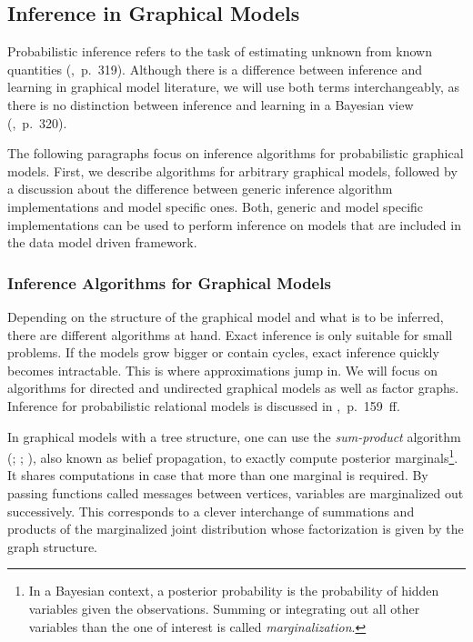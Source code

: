 \subsection{Inference in Graphical Models}
\label{subsec:inference}

Probabilistic inference refers to the task of estimating unknown from known quantities (\cite{murphy2012machine},~p.~319). Although there is a difference between inference and learning in graphical model literature, we will use both terms interchangeably, as there is no distinction between inference and learning in a Bayesian view (\cite{murphy2012machine},~p.~320).

The following paragraphs focus on inference algorithms for probabilistic graphical models. First, we describe algorithms for arbitrary graphical models, followed by a discussion about the difference between generic inference algorithm implementations and model specific ones. Both, generic and model specific implementations can be used to perform inference on models that are included in the data model driven framework.

\subsubsection{Inference Algorithms for Graphical Models}

Depending on the structure of the graphical model and what is to be inferred, there are different algorithms at hand. Exact inference is only suitable for small problems. If the models grow bigger or contain cycles, exact inference quickly becomes intractable. This is where approximations jump in. We will focus on algorithms for directed and undirected graphical models as well as factor graphs. Inference for probabilistic relational models is discussed in \textcite{getoor2007introduction},~p.~159~ff.

In graphical models with a tree structure, one can use the \emph{sum-product} algorithm (\cite{pearl1988probabilistic}; \cite{kim1983computational}; \cite{pearl1982reverend}), also known as belief propagation, to exactly compute posterior marginals\footnote{In a Bayesian context, a posterior probability is the probability of hidden variables given the observations. Summing or integrating out all other variables than the one of interest is called \emph{marginalization}.}. It shares computations in case that more than one marginal is required. By passing functions called messages between vertices, variables are marginalized out successively. This corresponds to a clever interchange of summations and products of the marginalized joint distribution whose factorization is given by the graph structure.

